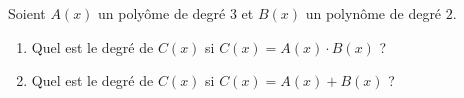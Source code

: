 %
%
    Soient $A(x)$ un polyôme de degré $3$ et $B(x)$ un polynôme de degré $2$.
    \begin{enumerate}
        \item Quel est le degré de $C(x)$ si $C(x) = A(x)\cdot B(x)$ ? \blank[width=1cm]{}
        \item Quel est le degré de $C(x)$ si $C(x) = A(x) +  B(x)$ ?
        \blank[width=1cm]{}
    \end{enumerate}
